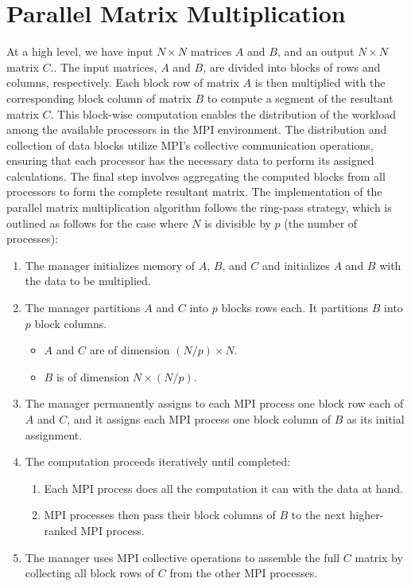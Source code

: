 \documentclass{article}
\begin{document}
\section{Parallel Matrix Multiplication}
At a high level, we have input $N \times N$ matrices $A$ and $B$, and an output $N \times N$ matrix $C$..
The input matrices, \(A\) and \(B\), are divided into blocks of rows and columns, respectively. 
Each block row of matrix \(A\) is then multiplied with the corresponding block column of matrix \(B\) 
to compute a segment of the resultant matrix \(C\). This block-wise computation enables the distribution 
of the workload among the available processors in the MPI environment. The distribution and collection of data blocks 
utilize MPI's collective communication operations, ensuring that each processor has the necessary data to perform 
its assigned calculations. The final step involves aggregating the computed blocks from all processors to form the complete resultant matrix.
The implementation of the parallel matrix multiplication algorithm follows the ring-pass strategy, which is outlined as follows for the case where $N$ is divisible by $p$ (the number of processes):
\begin{enumerate}
    \item The manager initializes memory of $A$, $B$, and $C$ and initializes $A$ and $B$ with the data to be multiplied.
    \item The manager partitions $A$ and $C$ into $p$ blocks rows each. It partitions $B$ into $p$ block columns.
    \begin{itemize}
        \item $A$ and $C$ are of dimension $(N/p) \times N$.
        \item $B$ is of dimension $N \times (N/p)$.
    \end{itemize}
    \item The manager permanently assigns to each MPI process one block row each of $A$ and $C$, and it assigns 
    each MPI process one block column of $B$ as its initial assignment.
    \item The computation proceeds iteratively until completed:
    \begin{enumerate}
        \item Each MPI process does all the computation it can with the data at hand.
        \item MPI processes then pass their block columns of $B$ to the next higher-ranked MPI process.
    \end{enumerate}
    \item The manager uses MPI collective operations to assemble the full $C$ matrix by collecting 
    all block rows of $C$ from the other MPI processes.
\end{enumerate}
\end{document}
